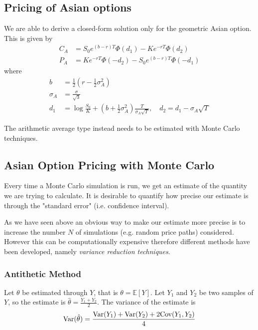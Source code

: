 \subsection{Pricing of Asian options}
We are able to derive a closed-form solution only for the geometric Asian option.
This is given by 
\begin{equation}
\begin{aligned}
C_A&=S_{0}e^{(b-r)T}\Phi (d_{1})-Ke^{-rT}\Phi (d_{2})\\
P_A&=Ke^{-rT}\Phi (-d_{2})-S_{0}e^{(b-r)T}\Phi (-d_{1})
\end{aligned}
\end{equation}
where 
\begin{equation}
\begin{aligned}
b&=\frac{1}{2}\left(r-\frac{1}{2}\sigma _A^2\right)\\
\sigma _A&=\frac{\sigma}{\sqrt{3}} \\
d_1 &=\log{\frac{S_0}{K}}+\left(b+\frac{1}{2}\sigma^2_A\right)\frac{T}{\sigma_A \sqrt{T}},\quad d_2=d_1-\sigma_A \sqrt {T}
\end{aligned}
\end{equation}

The arithmetic average type instead needs to be estimated with Monte Carlo techniques.

\subsection{Asian Option Pricing with Monte Carlo}

Every time a Monte Carlo simulation is run, we get an estimate of the quantity we are trying to calculate. It is desirable to quantify how precise our estimate is through the "standard error" (i.e. confidence interval).

As we have seen above an obvious way to make our estimate more precise is to increase the number $N$ of simulations (e.g. random price paths) considered. However this can be computationally expensive therefore different methods have been developed, namely \emph{variance reduction techniques}.

\subsubsection{Antithetic Method}
Let $\theta$ be estimated through $Y$, that is $\theta=\mathbb{E}[Y]$. Let $Y_1$ and $Y_2$ be two samples of $Y$, so the estimate is $\hat{\theta}=\frac{Y_1+Y_2}{2}$. The variance of the estimate is 
\begin{equation*}
\text{Var}(\hat{\theta}) = \frac{\text{Var}(Y_1)+\text{Var}(Y_2)+2\text{Cov}(Y_1,Y_2)}{4}
\end{equation*}

